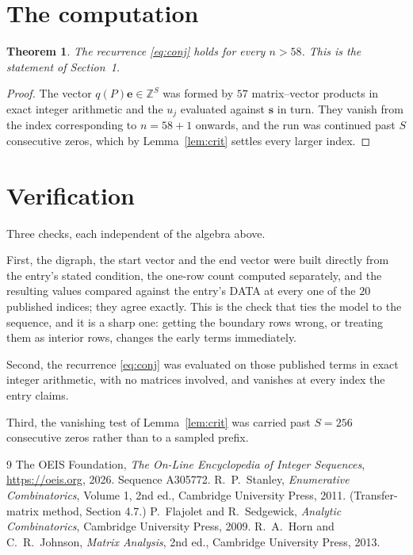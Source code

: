 \documentclass[11pt,a4paper]{article}
\theoremstyle{plain}
\newtheorem{theorem}{Theorem}
\theoremstyle{definition}
\begin{document}
\section{The computation}

\begin{theorem}
The recurrence \eqref{eq:conj} holds for every $n>58$. This is the statement of
Section~1.
\end{theorem}

\begin{proof}
The vector $q(P)\mathbf{e}\in\mathbb{Z}^{S}$ was formed by $57$ matrix--vector
products in exact integer arithmetic and the $u_j$ evaluated against $\mathbf{s}$ in turn.
They vanish from the index corresponding to $n=58+1$ onwards, and the run was continued
past $S$ consecutive zeros, which by Lemma~\ref{lem:crit} settles every larger index.
\end{proof}

\section{Verification}

Three checks, each independent of the algebra above.

First, the digraph, the start vector and the end vector were built directly from the
entry's stated condition, the one-row count computed separately, and the resulting values
compared against the entry's DATA at every one of the $20$ published indices; they
agree exactly. This is the check that ties the model to the sequence, and it is a sharp one:
getting the boundary rows wrong, or treating them as interior rows, changes the early terms
immediately.

Second, the recurrence \eqref{eq:conj} was evaluated on those published terms in exact
integer arithmetic, with no matrices involved, and vanishes at every index the entry claims.

Third, the vanishing test of Lemma~\ref{lem:crit} was carried past $S=256$ consecutive
zeros rather than to a sampled prefix.

\begin{thebibliography}{9}
 The OEIS Foundation, \emph{The On-Line Encyclopedia of Integer
Sequences}, \url{https://oeis.org}, 2026. Sequence A305772.
 R.~P.~Stanley, \emph{Enumerative Combinatorics}, Volume 1, 2nd ed.,
Cambridge University Press, 2011. (Transfer-matrix method, Section 4.7.)
 P.~Flajolet and R.~Sedgewick, \emph{Analytic Combinatorics}, Cambridge
University Press, 2009.
 R.~A.~Horn and C.~R.~Johnson, \emph{Matrix Analysis}, 2nd ed., Cambridge
University Press, 2013.
\end{thebibliography}
\end{document}
